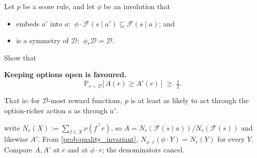 \documentclass[11pt]{article}
\newcommand{\Prob}{\mathbb{P}}
\newcommand{\Dist}{\mathcal{D}}    %
\newcommand{\F}{\mathcal{F}}       %
\begin{document}
\begin{exercise}
\label{prob:power_seeking} Let $p$ be a score rule, and let $\phi$ be an
involution that
\begin{itemize}\itemsep=2pt
  \item[1.] embeds $a'$ into $a$: $\ \phi\cdot\F(s\mid a') \subseteq \F(s\mid a)$; and
  \item[2.] is a symmetry of $\Dist$: $\ \phi_*\Dist = \Dist$.
\end{itemize}
Show that

\begin{callout}
\textbf{Keeping options open is favoured.}
$$
\Prob_{r\sim\Dist}\bigl[\, A(r) \ge A'(r) \,\bigr] \;\ge\; \tfrac{1}{2}.
$$
\end{callout}

\noindent That is: for $\Dist$-most reward functions, $p$ is at least as likely to act through the
option-richer action $a$ as through $a'$.
\end{exercise}
\begin{hint}
write $N_r(X) := \sum_{f\in X}\nu(f^\top r)$, so $A = N_r(\F(s\mid a))/N_r(\F(s))$ and
likewise $A'$. From \cref{prob:quality_invariant}, $N_{\phi\cdot r}(\phi\cdot Y) = N_r(Y)$ for every
$Y$. Compare $A, A'$ at $r$ and at $\phi\cdot r$; the denominators cancel.
\end{hint}
\end{document}
